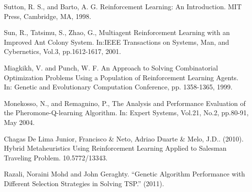 \begin{thebibliography}{9}
Sutton,  R.  S.,  and  Barto,  A.  G. Reinforcement  Learning:  An  Introduction.  MIT  Press, Cambridge, MA, 1998.

Sun,  R.,  Tatsimu,  S.,  Zhao,  G.,  Multiagent  Reinforcement  Learning  with  an  Improved Ant  Colony  System.  In:IEEE  Transactions  on  Systems,  Man,  and  Cybernetics,  Vol.3, pp.1612-1617, 2001.

 Miagkikh,  V.  and  Punch,  W.  F.  An  Approach  to  Solving  Combinatorial  Optimization Problems   Using   a   Population   of   Reinforcement   Learning   Agents.   In: Genetic   and Evolutionary Computation Conference, pp. 1358-1365, 1999. 

 Monekosso,  N.,  and  Remagnino,  P.,  The  Analysis  and  Performance  Evaluation  of  the Pheromone-Q-learning Algorithm. In: Expert Systems, Vol.21, No.2, pp.80-91, May 2004. 

Chagas De Lima Junior, Francisco \& Neto, Adriao Duarte \& Melo, J.D.. (2010). Hybrid Metaheuristics Using Reinforcement Learning Applied to Salesman Traveling Problem. 10.5772/13343.

Razali, Noraini Mohd and John Geraghty. “Genetic Algorithm Performance with Different Selection Strategies in Solving TSP.” (2011).
\end{thebibliography}

